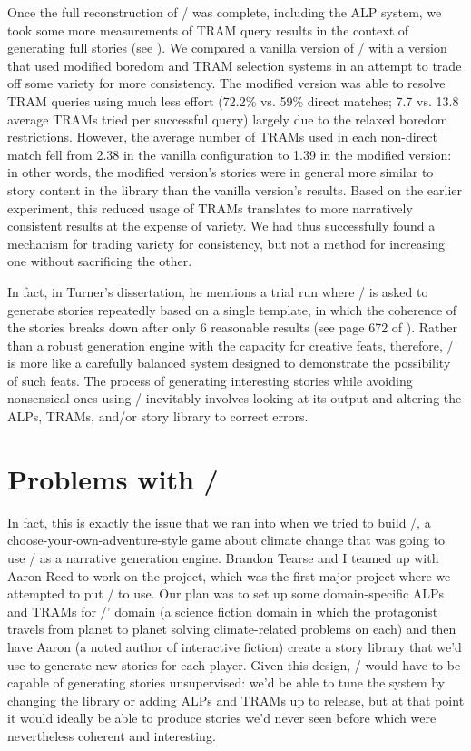 Once the full reconstruction of \minstrel/ was complete, including the ALP system, we took some more measurements of TRAM query results in the context of generating full stories (see \citep{Tearse2012}).
%
We compared a vanilla version of \skald/ with a version that used modified boredom and TRAM selection systems in an attempt to trade off some variety for more consistency.
%
The modified version was able to resolve TRAM queries using much less effort (72.2\% vs. 59\% direct matches; 7.7 vs. 13.8 average TRAMs tried per successful query) largely due to the relaxed boredom restrictions.
%
However, the average number of TRAMs used in each non-direct match fell from 2.38 in the vanilla configuration to 1.39 in the modified version: in other words, the modified version's stories were in general more similar to story content in the library than the vanilla version's results.
%
Based on the earlier experiment, this reduced usage of TRAMs translates to more narratively consistent results at the expense of variety. 
%
We had thus successfully found a mechanism for trading variety for consistency, but not a method for increasing one without sacrificing the other.


In fact, in Turner's dissertation, he mentions a trial run where \minstrel/ is asked to generate stories repeatedly based on a single template, in which the coherence of the stories breaks down after only 6 reasonable results (see page 672 of \citep{Turner1993}).
%
Rather than a robust generation engine with the capacity for creative feats, therefore, \minstrel/ is more like a carefully balanced system designed to demonstrate the possibility of such feats.
%
The process of generating interesting stories while avoiding nonsensical ones using \minstrel/ inevitably involves looking at its output and altering the ALPs, TRAMs, and/or story library to correct errors.


\section{Problems with \problemplanets/}

\label{sec:problem-planets-problems}

In fact, this is exactly the issue that we ran into when we tried to build \problemplanets/, a choose-your-own-adventure-style game about climate change that was going to use \skald/ as a narrative generation engine.
%
Brandon Tearse and I teamed up with Aaron Reed to work on the project, which was the first major project where we attempted to put \skald/ to use.
%
Our plan was to set up some domain-specific ALPs and TRAMs for \problemplanets/' domain (a science fiction domain in which the protagonist travels from planet to planet solving climate-related problems on each) and then have Aaron (a noted author of interactive fiction) create a story library that we'd use to generate new stories for each player.
%
Given this design, \skald/ would have to be capable of generating stories unsupervised: we'd be able to tune the system by changing the library or adding ALPs and TRAMs up to release, but at that point it would ideally be able to produce stories we'd never seen before which were nevertheless coherent and interesting.


